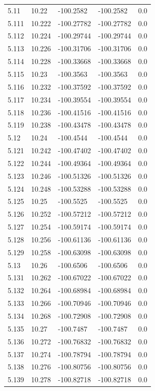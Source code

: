 \begin{tabular}{lllll}
5.11 & 10.22 & -100.2582 & -100.2582 & 0.0 \\
5.111 & 10.222 & -100.27782 & -100.27782 & 0.0 \\
5.112 & 10.224 & -100.29744 & -100.29744 & 0.0 \\
5.113 & 10.226 & -100.31706 & -100.31706 & 0.0 \\
5.114 & 10.228 & -100.33668 & -100.33668 & 0.0 \\
5.115 & 10.23 & -100.3563 & -100.3563 & 0.0 \\
5.116 & 10.232 & -100.37592 & -100.37592 & 0.0 \\
5.117 & 10.234 & -100.39554 & -100.39554 & 0.0 \\
5.118 & 10.236 & -100.41516 & -100.41516 & 0.0 \\
5.119 & 10.238 & -100.43478 & -100.43478 & 0.0 \\
5.12 & 10.24 & -100.4544 & -100.4544 & 0.0 \\
5.121 & 10.242 & -100.47402 & -100.47402 & 0.0 \\
5.122 & 10.244 & -100.49364 & -100.49364 & 0.0 \\
5.123 & 10.246 & -100.51326 & -100.51326 & 0.0 \\
5.124 & 10.248 & -100.53288 & -100.53288 & 0.0 \\
5.125 & 10.25 & -100.5525 & -100.5525 & 0.0 \\
5.126 & 10.252 & -100.57212 & -100.57212 & 0.0 \\
5.127 & 10.254 & -100.59174 & -100.59174 & 0.0 \\
5.128 & 10.256 & -100.61136 & -100.61136 & 0.0 \\
5.129 & 10.258 & -100.63098 & -100.63098 & 0.0 \\
5.13 & 10.26 & -100.6506 & -100.6506 & 0.0 \\
5.131 & 10.262 & -100.67022 & -100.67022 & 0.0 \\
5.132 & 10.264 & -100.68984 & -100.68984 & 0.0 \\
5.133 & 10.266 & -100.70946 & -100.70946 & 0.0 \\
5.134 & 10.268 & -100.72908 & -100.72908 & 0.0 \\
5.135 & 10.27 & -100.7487 & -100.7487 & 0.0 \\
5.136 & 10.272 & -100.76832 & -100.76832 & 0.0 \\
5.137 & 10.274 & -100.78794 & -100.78794 & 0.0 \\
5.138 & 10.276 & -100.80756 & -100.80756 & 0.0 \\
5.139 & 10.278 & -100.82718 & -100.82718 & 0.0 \\

\end{tabular}
